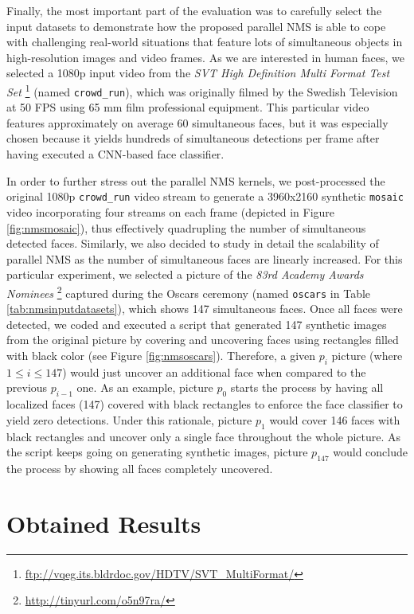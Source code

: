 Finally, the most important part of the evaluation was to carefully select the input datasets to demonstrate how the proposed parallel NMS 
is able to cope with challenging real-world situations that feature lots of simultaneous objects in high-resolution images and video frames. 
As we are interested in human faces, we selected a 1080p input video from the 
\emph{SVT High Definition Multi Format Test Set} \footnote{\url{ftp://vqeg.its.bldrdoc.gov/HDTV/SVT_MultiFormat/}} (named 
\texttt{crowd\_run}), which was originally filmed by the Swedish Television at 50 FPS using 65 mm film professional equipment. This particular 
video features approximately on average 60 simultaneous faces, but it was especially chosen because it yields hundreds of simultaneous detections per frame after 
having executed a CNN-based face classifier.

In order to further stress out the parallel NMS kernels, we post-processed the original 1080p \texttt{crowd\_run} video stream to generate a 3960x2160 synthetic 
\texttt{mosaic} video incorporating four streams on each frame (depicted in Figure \ref{fig:nmsmosaic}), thus effectively quadrupling the number of simultaneous 
detected faces. Similarly, we also decided to study in detail the scalability of parallel NMS as the number of simultaneous faces are linearly increased. For this 
particular experiment, we selected a picture of the \emph{83rd Academy Awards Nominees} \footnote{\url{http://tinyurl.com/o5n97ra/}} captured during 
the Oscars ceremony (named \texttt{oscars} in Table \ref{tab:nmsinputdatasets}), which shows 147 simultaneous 
faces. Once all faces were detected, we coded and executed a script that generated 147 synthetic images from the original picture by covering and uncovering faces 
using rectangles filled with black color (see Figure \ref{fig:nmsoscars}). Therefore, a given $p_i$ picture (where $1 \leq i \leq 147$) would just uncover an additional 
face when compared to the previous $p_{i-1}$ one. As an example, picture $p_{0}$ starts the process by having all localized faces (147) covered with black 
rectangles to enforce the face classifier to yield zero detections. Under this rationale, picture $p_{1}$ would cover 146 faces with black 
rectangles and uncover only a single face throughout the whole picture. As the script keeps going on generating synthetic images, picture $p_{147}$ 
would conclude the process by showing all faces completely uncovered.

\section{Obtained Results}

